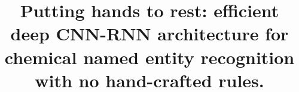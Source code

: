 \documentclass[twocolumn]{bmcart}%
\begin{document}
\begin{frontmatter}

\begin{fmbox}


\title{Putting hands to rest: efficient deep CNN-RNN architecture for chemical named entity recognition with no hand-crafted rules.}


\author[
   addressref={aff1, aff2, aff3},       %
   corref={aff1},                       %
   email={ilia.korvigo@gmail.com}   %
]{ }
\author[
   addressref={aff4, aff5},
   email={maksim.holmatov@gmail.com}
]{ }
\author[
   addressref={aff1},
   email={anton.karazeev@phystech.edu}
]{ }
\author[
   addressref={aff6},
   email={st010379@student.spbu.ru}
]{ }
\author[
   addressref={aff1},
   email={mskoblov@gmail.com}
]{ }



\end{fmbox}
\end{frontmatter}
\end{document}
